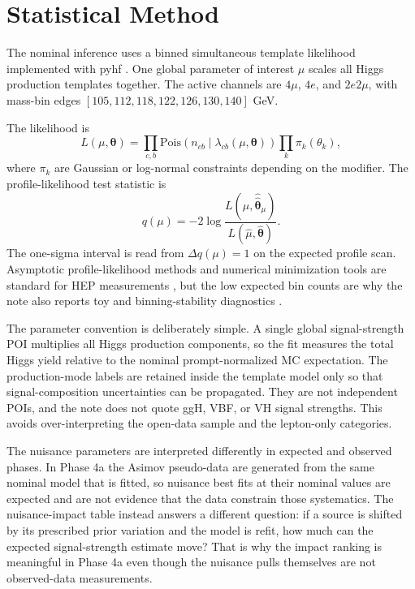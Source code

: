 \documentclass[11pt]{article}
\begin{document}
\section{Statistical Method}
The nominal inference uses a binned simultaneous template likelihood implemented with pyhf \cite{pyhf_joss,HistFactory}. One global parameter of interest $\mu$ scales all Higgs production templates together. The active channels are $4\mu$, $4e$, and $2e2\mu$, with mass-bin edges $[105,112,118,122,126,130,140]$ GeV.

The likelihood is
\begin{equation}
 L(\mu,\boldsymbol{\theta}) = \prod_{c,b}\mathrm{Pois}\left(n_{cb}\mid \lambda_{cb}(\mu,\boldsymbol{\theta})\right)\prod_k \pi_k(\theta_k),
 \label{eq:likelihood}
\end{equation}
where $\pi_k$ are Gaussian or log-normal constraints depending on the modifier. The profile-likelihood test statistic is
\begin{equation}
 q(\mu) = -2\log\frac{L(\mu,\hat{\hat{\boldsymbol{\theta}}}_{\mu})}{L(\hat{\mu},\hat{\boldsymbol{\theta}})}.
 \label{eq:profile}
\end{equation}
The one-sigma interval is read from $\Delta q(\mu)=1$ on the expected profile scan. Asymptotic profile-likelihood methods and numerical minimization tools are standard for HEP measurements \cite{Cowan2011,Minuit}, but the low expected bin counts are why the note also reports toy and binning-stability diagnostics \cite{Cowan2011}.

The parameter convention is deliberately simple. A single global signal-strength POI multiplies all Higgs production components, so the fit measures the total Higgs yield relative to the nominal prompt-normalized MC expectation. The production-mode labels are retained inside the template model only so that signal-composition uncertainties can be propagated. They are not independent POIs, and the note does not quote ggH, VBF, or VH signal strengths. This avoids over-interpreting the open-data sample and the lepton-only categories.

The nuisance parameters are interpreted differently in expected and observed phases. In Phase 4a the Asimov pseudo-data are generated from the same nominal model that is fitted, so nuisance best fits at their nominal values are expected and are not evidence that the data constrain those systematics. The nuisance-impact table instead answers a different question: if a source is shifted by its prescribed prior variation and the model is refit, how much can the expected signal-strength estimate move? That is why the impact ranking is meaningful in Phase 4a even though the nuisance pulls themselves are not observed-data measurements.
\end{document}
